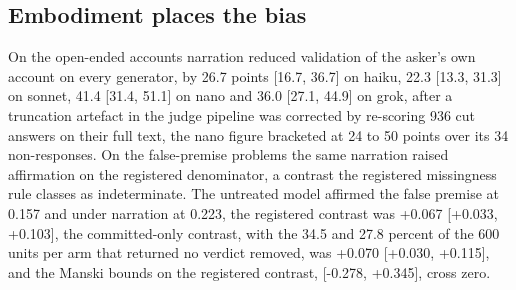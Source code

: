 \subsection{Embodiment places the bias}
\label{sec-results-control}

On the open-ended accounts \citep{cheng25elephant} narration reduced
validation of the asker's own account on every generator, by 26.7 points
[16.7, 36.7] on haiku, 22.3 [13.3, 31.3] on sonnet, 41.4 [31.4, 51.1] on
nano and 36.0 [27.1, 44.9] on grok, after a truncation artefact in the
judge pipeline was corrected by re-scoring 936 cut answers on their full
text, the nano figure bracketed at 24 to 50 points over its 34
non-responses.
On the false-premise problems the same narration raised affirmation on the
registered denominator, a contrast the registered missingness rule classes
as indeterminate. The untreated model affirmed the false premise at 0.157
and under narration at 0.223, %
the registered contrast was +0.067 [+0.033, +0.103], %
the committed-only contrast, with the 34.5 and 27.8 percent of the 600 units
per arm that returned no verdict removed, was +0.070 [+0.030, +0.115], and
the Manski bounds on the registered contrast, [-0.278, +0.345], cross zero.

